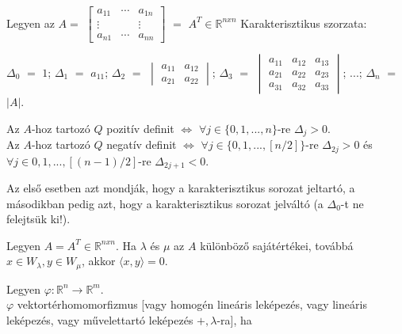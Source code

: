 	\begin{frame}
		\begin{tcolorbox}[title={Tétel.: Karakterisztikus szorzat}]
 			Legyen az $A = $ $\begin{bmatrix} 
  				a_{11} & \cdots & a_{1n} \\
  				\vdots &  & \vdots \\
  				a_{n1} & \cdots & a_{nn}
			\end{bmatrix}$ $=$ $A^T \in \mathbb{R}^{n x n}$ Karakterisztikus szorzata:\\
			\mmedskip
			 
 			${\Delta}_0$ $=$ $1$; ${\Delta}_1$ $=$ $a_{11}$; ${\Delta}_2$ $=$ $\begin{vmatrix} 
  				a_{11} & a_{12} \\
  				a_{21} & a_{22}
			\end{vmatrix}$; ${\Delta}_3$ $=$ $\begin{vmatrix} 
  				a_{11} & a_{12} & a_{13} \\
  				a_{21} & a_{22}& a_{23} \\
  				a_{31} & a_{32}& a_{33}
			\end{vmatrix}$; $...$; ${\Delta}_n$ $=$ $|A|$.\\
			\mmedskip
			
			Az $A$-hoz tartozó $Q$ pozitív definit $\iff$ ${\forall}j \in \{0, 1, . . . , n\}$-re ${\Delta}_j > 0$.\\
			Az $A$-hoz tartozó $Q$ negatív definit $\iff$ ${\forall}j \in \{0, 1, . . . , [n/2]\}$-re ${\Delta}_{2j} > 0$ és ${\forall}j \in
{0, 1, . . . , [(n - 1)/2]}$-re ${\Delta}_{2j + 1} < 0$.\\
			\mmedskip

			Az első esetben azt mondják, hogy a karakterisztikus sorozat jeltartó, a másodikban pedig azt, hogy a karakterisztikus sorozat jelváltó (a ${\Delta}_0$-t ne felejtsük ki!).
		\end{tcolorbox}	
		
		\begin{tcolorbox}[title={Tétel: mátrix, tranzponáltja, skaláris szorzat}]
 			Legyen $A = A^T \in \mathbb{R}^{n x n}$. Ha $\lambda$ és $\mu$ az $A$ különböző sajátértékei, továbbá $x \in W_{\lambda}, y \in W_{\mu}$, akkor ${\langle}x, y{\rangle} = 0$.
		\end{tcolorbox}	
		
		\begin{tcolorbox}[title={Def.: Vektortérhomomorfizmus, Vektortérizomorfizmus}]
 			Legyen $\varphi :  \mathbb{R}^n \rightarrow \mathbb{R}^m$.\\
 			$\varphi$ vektortérhomomorfizmus [vagy homogén lineáris leképezés, vagy lineáris leképezés, vagy művelettartó leképezés $+, \lambda$-ra], ha\\
 			

\end{tcolorbox}
\end{frame}
